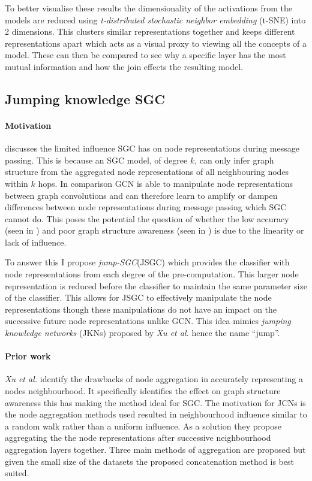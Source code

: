 To better visualise these results the dimensionality of the activations from the models are reduced using \emph{t-distributed stochastic neighbor embedding} (t-SNE) into 2 dimensions.
This clusters similar representations together and keeps different representations apart which acts as a visual proxy to viewing all the concepts of a model.
These can then be compared to see why a specific layer has the most mutual information and how the join effects the resulting model.

\subsection{Jumping knowledge SGC}
\paragraph{Motivation}
 discusses the limited influence SGC has on node representations during message passing.
This is because an SGC model, of degree $k$, can only infer graph structure from the aggregated node representations of all neighbouring nodes within $k$ hops.
In comparison GCN is able to manipulate node representations between graph convolutions and can therefore learn to amplify or dampen differences between node representations during message passing which SGC cannot do.
This poses the potential the question of whether the low accuracy (seen in ) and poor graph structure awareness (seen in ) is due to the linearity or lack of influence.

To answer this I propose \emph{jump-SGC}(JSGC) which provides the classifier with node representations from each degree of the pre-computation.
This larger node representation is reduced before the classifier to maintain the same parameter size of the classifier.
This allows for JSGC to effectively manipulate the node representations though these manipulations do not have an impact on the successive future node representations unlike GCN.
This idea mimics \emph{jumping knowledge networks} (JKNs) proposed by \textit{Xu et al.}\cite{xu2018representation} hence the name ``jump''.

\paragraph{Prior work}
\textit{Xu et al.}\cite{xu2018representation} identify the drawbacks of node aggregation in accurately representing a nodes neighbourhood.
It specifically identifies the effect on graph structure awareness this has making the method ideal for SGC.
The motivation for JCNs is the node aggregation methods used resulted in neighbourhood influence similar to a random walk rather than a uniform influence.
As a solution they propose aggregating the the node representations after successive neighbourhood aggregation layers together.
Three main methods of aggregation are proposed but given the small size of the datasets the proposed concatenation method is best suited.

